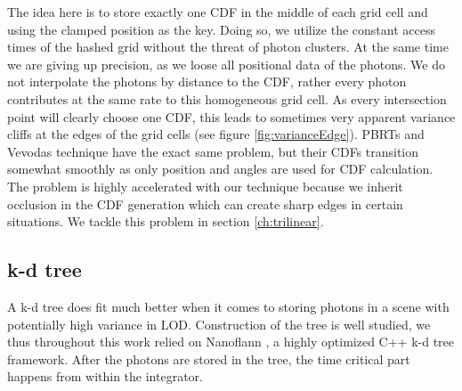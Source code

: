 The idea here is to store exactly one CDF in the middle of each grid cell and using the clamped position as the key. Doing so, we utilize the constant access times of the hashed grid without the threat of photon clusters. At the same time we are giving up precision, as we loose all positional data of the photons. We do not interpolate the photons by distance to the CDF, rather every photon contributes at the same rate to this homogeneous grid cell. As every intersection point will clearly choose one CDF, this leads to sometimes very apparent variance cliffs at the edges of the grid cells (see figure \ref{fig:varianceEdge}). PBRTs \cite{pbrt} and Vevodas \cite{Vevoda}  technique have the exact same problem, but their CDFs transition somewhat smoothly as only position and angles are used for CDF calculation. The problem is highly accelerated with our technique because we inherit occlusion in the CDF generation which can create sharp edges in certain situations. We tackle this problem in section \ref{ch:trilinear}.


\subsection{k-d tree}
\label{sec:pneekdtree}

A k-d tree does fit much better when it comes to storing photons in a scene with potentially high variance in LOD. Construction of the tree is well studied, we thus throughout this work relied on Nanoflann \cite{blanco2014nanoflann}, a highly optimized C++ k-d tree framework. After the photons are stored in the tree, the time critical part happens from within the integrator. 

